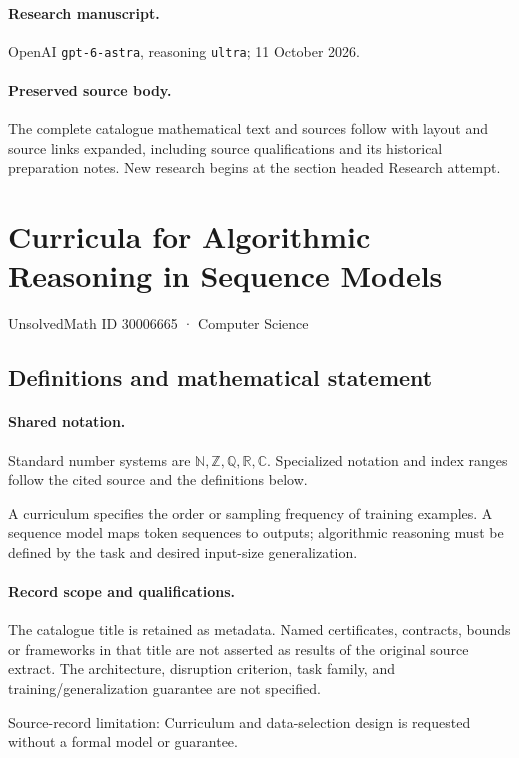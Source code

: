 \documentclass[11pt]{article}
\begin{document}
\paragraph{Research manuscript.} OpenAI \texttt{gpt-6-astra}, reasoning \texttt{ultra}; 11 October 2026.
\paragraph{Preserved source body.} The complete catalogue mathematical text and sources follow with layout and source links expanded, including source qualifications and its historical preparation notes. New research begins at the section headed Research attempt.

\section{Curricula for Algorithmic Reasoning in Sequence Models}\label{30006665}
{\small UnsolvedMath ID 30006665 · Computer Science}
\subsection{Definitions and mathematical statement}

\paragraph{Shared notation.}Standard number systems are $\mathbb N,\mathbb Z,\mathbb Q,\mathbb R,\mathbb C$. Specialized notation and index ranges follow the cited source and the definitions below.


A curriculum specifies the order or sampling frequency of training examples. A sequence model maps token sequences to outputs; algorithmic reasoning must be defined by the task and desired input-size generalization.
\paragraph{Record scope and qualifications.}
The catalogue title is retained as metadata. Named certificates, contracts, bounds or frameworks in that title are not asserted as results of the original source extract.
The architecture, disruption criterion, task family, and training/generalization guarantee are not specified.

Source-record limitation: Curriculum and data-selection design is requested without a formal model or guarantee.
\end{document}
